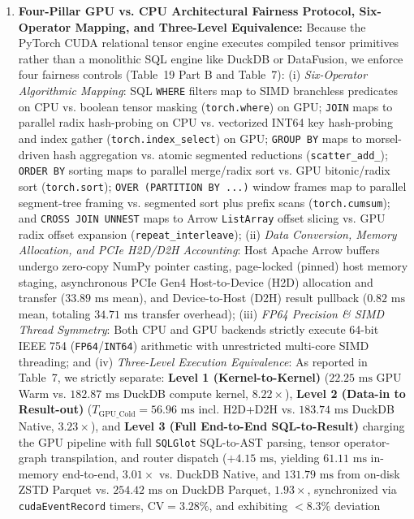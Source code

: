 \documentclass[10pt,a4paper]{article}
\begin{document}
\begin{enumerate}[leftmargin=1.5em,itemsep=2pt]
query execution complexity---including distributed cloud slot compute time on BigQuery ($\rho = 0.5124, p = 2.41\times 10^{-6}$), Apache DataFusion CPU latency ($\rho = 0.3839, p = 0.0007$), and Polars latency ($\rho = 0.3137, p = 0.0061$)---and on the external 22-query TPC-H suite (Q1--Q22) exhibits strong alignment with AST node complexity ($\rho = 0.8418, p = 9.12\times 10^{-7}$) and a partial correlation of $\rho_{\text{partial}} = 0.5840$ ($p = 0.0054$) with join/subquery execution work controlling for scanned table volume.
    \item \textbf{Four-Pillar GPU vs. CPU Architectural Fairness Protocol, Six-Operator Mapping, and Three-Level Equivalence:} Because the PyTorch CUDA relational tensor engine executes compiled tensor primitives rather than a monolithic SQL engine like DuckDB or DataFusion, we enforce four fairness controls (Table~19 Part B and Table~7): (i) \emph{Six-Operator Algorithmic Mapping}: SQL \texttt{WHERE} filters map to SIMD branchless predicates on CPU vs. boolean tensor masking (\texttt{torch.where}) on GPU; \texttt{JOIN} maps to parallel radix hash-probing on CPU vs. vectorized INT64 key hash-probing and index gather (\texttt{torch.index\_\allowbreak{}select}) on GPU; \texttt{GROUP BY} maps to morsel-driven hash aggregation vs. atomic segmented reductions (\texttt{scatter\_\allowbreak{}add\_\allowbreak{}}); \texttt{ORDER BY} sorting maps to parallel merge/radix sort vs. GPU bitonic/radix sort (\texttt{torch.sort}); \texttt{OVER (PARTITION BY ...)} window frames map to parallel segment-tree framing vs. segmented sort plus prefix scans (\texttt{torch.cumsum}); and \texttt{CROSS JOIN UNNEST} maps to Arrow \texttt{ListArray} offset slicing vs. GPU radix offset expansion (\texttt{repeat\_\allowbreak{}interleave}); (ii) \emph{Data Conversion, Memory Allocation, and PCIe H2D/D2H Accounting}: Host Apache Arrow buffers undergo zero-copy NumPy pointer casting, page-locked (pinned) host memory staging, asynchronous PCIe Gen4 Host-to-Device (H2D) allocation and transfer ($33.89\text{ ms}$ mean), and Device-to-Host (D2H) result pullback ($0.82\text{ ms}$ mean, totaling $34.71\text{ ms}$ transfer overhead); (iii) \emph{FP64 Precision \& SIMD Thread Symmetry}: Both CPU and GPU backends strictly execute 64-bit IEEE 754 (\texttt{FP64}/\texttt{INT64}) arithmetic with unrestricted multi-core SIMD threading; and (iv) \emph{Three-Level Execution Equivalence}: As reported in Table~7, we strictly separate: \textbf{Level 1 (Kernel-to-Kernel)} ($22.25\text{ ms}$ GPU Warm vs. $182.87\text{ ms}$ DuckDB compute kernel, $8.22\times$), \textbf{Level 2 (Data-in to Result-out)} ($T_{\text{GPU\_Cold}} = 56.96\text{ ms}$ incl. H2D+D2H vs. $183.74\text{ ms}$ DuckDB Native, $3.23\times$), and \textbf{Level 3 (Full End-to-End SQL-to-Result)} charging the GPU pipeline with full \texttt{SQLGlot} SQL-to-AST parsing, tensor operator-graph transpilation, and router dispatch ($+4.15\text{ ms}$, yielding $61.11\text{ ms}$ in-memory end-to-end, $3.01\times$ vs. DuckDB Native, and $131.79\text{ ms}$ from on-disk ZSTD Parquet vs. $254.42\text{ ms}$ on DuckDB Parquet, $1.93\times$, synchronized via \texttt{cudaEventRecord} timers, $\text{CV}=3.28\%$, and exhibiting $<8.3\%$ deviation 
\end{enumerate}
\end{document}
